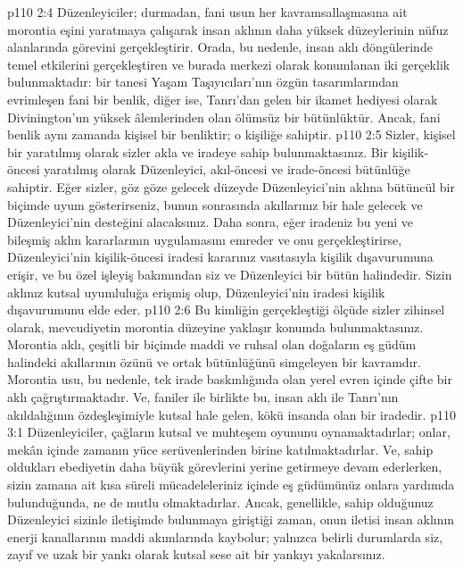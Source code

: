 \vs p110 2:4 Düzenleyiciler; durmadan, fani usun her kavramsallaşmasına ait morontia eşini yaratmaya çalışarak insan aklının daha yüksek düzeylerinin nüfuz alanlarında görevini gerçekleştirir. Orada, bu nedenle, insan aklı döngülerinde temel etkilerini gerçekleştiren ve burada merkezi olarak konumlanan iki gerçeklik bulunmaktadır: bir tanesi Yaşam Taşıyıcıları’nın özgün tasarımlarından evrimleşen fani bir benlik, diğer ise, Tanrı’dan gelen bir ikamet hediyesi olarak Divinington’un yüksek âlemlerinden olan ölümsüz bir bütünlüktür. Ancak, fani benlik aynı zamanda kişisel bir benliktir; o kişiliğe sahiptir.
\vs p110 2:5 Sizler, kişisel bir yaratılmış olarak sizler akla ve iradeye sahip bulunmaktasınız. Bir kişilik\hyp{}öncesi yaratılmış olarak Düzenleyici, akıl\hyp{}öncesi ve irade\hyp{}öncesi bütünlüğe sahiptir. Eğer sizler, göz göze gelecek düzeyde Düzenleyici’nin aklına bütüncül bir biçimde uyum gösterirseniz, bunun sonrasında akıllarınız bir hale gelecek ve Düzenleyici’nin desteğini alacaksınız. Daha sonra, eğer iradeniz bu yeni ve bileşmiş aklın kararlarının uygulamasını emreder ve onu gerçekleştirirse, Düzenleyici’nin kişilik\hyp{}öncesi iradesi kararınız vasıtasıyla kişilik dışavurumuna erişir, ve bu özel işleyiş bakımından siz ve Düzenleyici bir bütün halindedir. Sizin aklınız kutsal uyumluluğa erişmiş olup, Düzenleyici’nin iradesi kişilik dışavurumunu elde eder.
\vs p110 2:6 Bu kimliğin gerçekleştiği ölçüde sizler zihinsel olarak, mevcudiyetin morontia düzeyine yaklaşır konumda bulunmaktasınız. Morontia aklı, çeşitli bir biçimde maddi ve ruhsal olan doğaların eş güdüm halindeki akıllarının özünü ve ortak bütünlüğünü simgeleyen bir kavramdır. Morontia usu, bu nedenle, tek irade baskınlığında olan yerel evren içinde çifte bir aklı çağrıştırmaktadır. Ve, faniler ile birlikte bu, insan aklı ile Tanrı’nın akıldalığının özdeşleşimiyle kutsal hale gelen, kökü insanda olan bir iradedir.
\vs p110 3:1 Düzenleyiciler, çağların kutsal ve muhteşem oyununu oynamaktadırlar; onlar, mekân içinde zamanın yüce serüvenlerinden birine katılmaktadırlar. Ve, sahip oldukları ebediyetin daha büyük görevlerini yerine getirmeye devam ederlerken, sizin zamana ait kısa süreli mücadeleleriniz içinde eş güdümünüz onlara yardımda bulunduğunda, ne de mutlu olmaktadırlar. Ancak, genellikle, sahip olduğunuz Düzenleyici sizinle iletişimde bulunmaya giriştiği zaman, onun iletisi insan aklının enerji kanallarının maddi akımlarında kaybolur; yalnızca belirli durumlarda siz, zayıf ve uzak bir yankı olarak kutsal sese ait bir yankıyı yakalarsınız.
